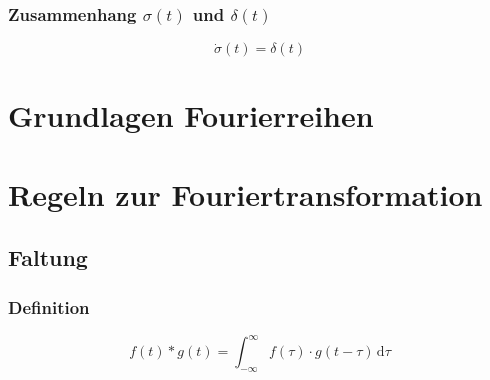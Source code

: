 \subsubsection{Zusammenhang $\sigma(t)$ und $\delta(t)$}
\begin{equation}
	\dot{\sigma}(t) = \delta(t)
\end{equation}

\section{Grundlagen Fourierreihen}


\section{Regeln zur Fouriertransformation}


\subsection{Faltung}
\subsubsection{Definition}
\begin{equation}
	f(t) * g(t) = \int_{-\infty}^{\infty}\!f(\tau) \cdot g(t-\tau) \, \mathrm{d}\tau 
\end{equation}

\clearpage

